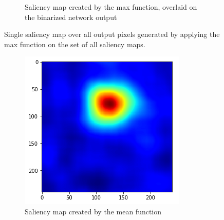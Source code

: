 \begin{figure}[H]
\begin{subfigure}[t]{.4\textwidth}
        \caption{Saliency map created by the max function, overlaid on the binarized network output}
    \end{subfigure}
    \caption{Single saliency map over all output pixels generated by applying the max function on the set of all saliency maps.}
    \label{rise_multipixel_max}
\end{figure}

\begin{figure}[H]
    \centering
    \begin{subfigure}[t]{.4\textwidth}
        \centering
        \includegraphics[width=\linewidth]{chapters/04_segmentation/images/rise_multipixel_mean_2-0.png}
        \caption{Saliency map created by the mean function}
    \end{subfigure}\hspace{1cm}%
    \begin{subfigure}[t]{.4\textwidth}
        \centering

\end{subfigure}
\end{figure}
